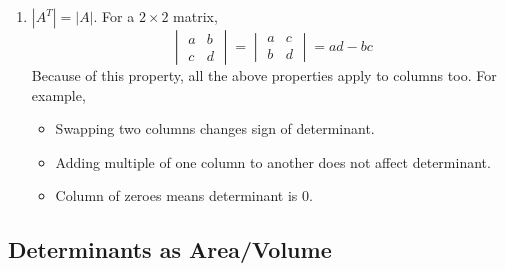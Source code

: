 \documentclass[../linear-algebra.tex]{subfiles}
\begin{document}
\begin{enumerate}
    \item $|A^T| = |A|$.
    For a $2 \times 2$ matrix,
    \[\begin{vmatrix} a & b \\ c & d \end{vmatrix} = \begin{vmatrix} a & c \\ b & d \end{vmatrix} = ad - bc\]
    Because of this property, all the above properties apply to columns too.
    For example,
    \begin{itemize}
        \item Swapping two columns changes sign of determinant.
        \item Adding multiple of one column to another does not affect determinant.
        \item Column of zeroes means determinant is 0.
    \end{itemize}
\end{enumerate}
\subsection{Determinants as Area/Volume}
\end{document}
